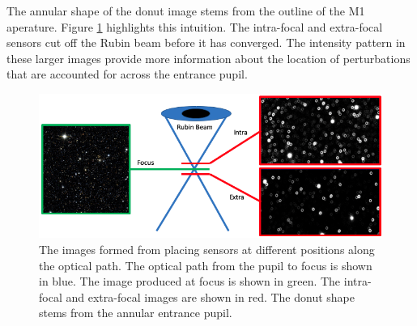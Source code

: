 The annular shape of the donut image stems from the outline of the M1 aperature. Figure \ref{fig:focalplane} highlights this intuition. The intra-focal and extra-focal sensors cut off the Rubin beam before it has converged. The intensity pattern in these larger images provide more information about the location of perturbations that are accounted for across the entrance pupil.

\begin{figure}[hbt!]
\centering
\includegraphics[width=14cm, keepaspectratio]{figs/rubin_telescope_and_aos/donutintuition.png}
\caption[Donut Image Intuition]{The images formed from placing sensors at different positions along the optical path. The optical path from the pupil to focus is shown in blue. The image produced at focus is shown in green. The intra-focal and extra-focal images are shown in red. The donut shape stems from the annular entrance pupil.}
\label{fig:focalplane}
\end{figure}


